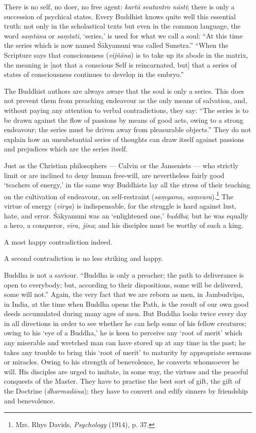 \documentclass[a4paper, 11pt, oneside, english, landscape]{article}
\begin{document}
There is no self, no doer, no free agent: \emph{kartā svatantro nāsti}; there is only a succession of psychical states. Every Buddhist knows quite well this essential truth: not only in the scholastical texts but even in the common language, the word \emph{saṃtāna} or \emph{saṃtati}, `series,' is used for what we call a soul: ``At this time the series which is now named Śākyamuni was called Sunetra.'' ``When the Scripture says that consciousness (\emph{vijñāna}) is to take up its abode in the matrix, the meaning is [not that a conscious Self is reincarnated, but] that a series of states of consciousness continues to develop in the embryo.''

The Buddhist authors are always aware that the soul is only a series. This does not prevent them from preaching endeavour as the only means of salvation, and, without paying any attention to verbal contradictions, they say: ``The series is to be drawn against the flow of passions by means of good acts, owing to a strong endeavour; the series must be driven away from pleasurable objects.'' They do not explain how an unsubstantial series of thoughts can draw itself against passions and prejudices which are the series itself.

Just as the Christian philosophers --- Calvin or the Jansenists --- who strictly limit or are inclined to deny human free-will, are nevertheless fairly good `teachers of energy,' in the same way Buddhists lay all the stress of their teaching on the cultivation of endeavour, on self-restraint (\emph{saṃyama, saṃvara}).\footnote{Mrs. Rhys Davids, \emph{Psychology} (1914), p. 37.} The virtue of energy (\emph{vīrya}) is indispensable, for the struggle is hard against lust, hate, and error. Śākyamuni was an `enlightened one,' \emph{buddha}; but he was equally a hero, a conqueror, \emph{vīra, jina}; and his disciples must be worthy of such a king.

A most happy contradiction indeed.

A second contradiction is no less striking and happy.

Buddha is not a saviour. ``Buddha is only a preacher; the path to deliverance is open to everybody; but, according to their dispositions, some will be delivered, some will not.'' Again, the very fact that we are reborn as men, in Jambudvīpa, in India, at the time when Buddha opens the Path, is the result of our own good deeds accumulated during many ages of men. But Buddha looks twice every day in all directions in order to see whether he can help some of his fellow creatures; owing to his `eye of a Buddha,' he is keen to perceive any `root of merit' which any miserable and wretched man can have stored up at any time in the past; he takes any trouble to bring this `root of merit' to maturity by appropriate sermons or miracles. Owing to his strength of benevolence, he converts whomsoever he will. His disciples are urged to imitate, in some way, the virtues and the peaceful conquests of the Master. They have to practise the best sort of gift, the gift of the Doctrine (\emph{dharmadāna}); they have to convert and edify sinners by friendship and benevolence.
\end{document}
